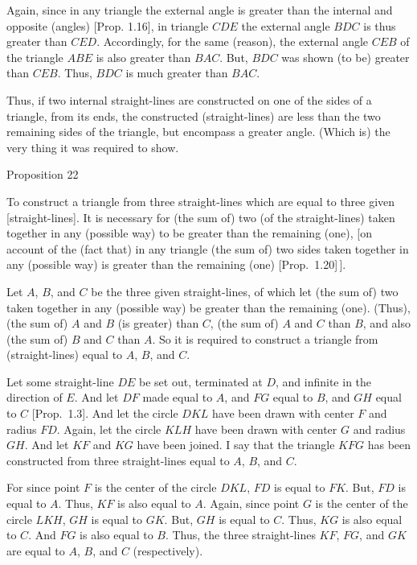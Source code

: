 Again, since in any  triangle the external angle 
is greater than the internal and opposite (angles) [Prop. 1.16],
 in triangle $CDE$ the external angle $BDC$ is thus greater
than $CED$.  Accordingly, for the same (reason),  the external angle $CEB$ of the
triangle $ABE$ is also greater than $BAC$. But, $BDC$ was shown (to be) 
greater
than $CEB$. Thus, $BDC$ is much greater than $BAC$.

Thus, if two internal straight-lines are constructed on one of the sides
of a triangle, from its ends, 
the constructed (straight-lines) are less than the two remaining 
sides of the triangle, but  encompass a greater angle. (Which is) the
very thing it was required to show.


\begin{center}
{\large Proposition 22}
\end{center}

To construct a triangle from three straight-lines which are equal to three given [straight-lines]. It is necessary for (the sum of) two (of the straight-lines) taken together in any (possible way) to be greater than the remaining (one), [on account of the (fact that)
 in any triangle (the sum of) two sides taken together in any (possible way) is greater than the remaining (one) [Prop.~1.20]\,].

\epsfysize=2.3in
\centerline{}

Let $A$, $B$, and $C$ be the three given straight-lines, of which let (the sum of) two taken together in any (possible way)
be greater than the remaining (one). (Thus), (the sum of) $A$ and $B$ (is greater) than $C$, (the sum of) $A$ and $C$ than $B$,
and also (the sum of) $B$ and $C$ than $A$. So it is required to construct a triangle
from (straight-lines) equal to $A$, $B$, and $C$.

Let some straight-line $DE$ be set out, terminated at $D$, and infinite in the
direction of $E$.  And let $DF$ made equal to $A$, and $FG$
equal to $B$, and $GH$ equal to $C$ [Prop.~1.3]. And let the
circle $DKL$ have been drawn with center $F$ and radius $FD$. Again,
let the circle $KLH$ have been drawn with center $G$ and radius $GH$. And
let $KF$ and $KG$ have been joined. I say that the triangle $KFG$ has been
constructed from three straight-lines equal to $A$, $B$, and $C$.

For since point $F$ is the center of the circle $DKL$, $FD$ is equal to $FK$.
But, $FD$ is equal to $A$. Thus, $KF$ is also equal to $A$. Again, since point
$G$ is the center of the circle $LKH$, $GH$ is equal to $GK$. But, $GH$ is equal
to $C$. Thus, $KG$ is also equal to $C$. And $FG$ is also equal to $B$. Thus,
the three straight-lines $KF$, $FG$, and $GK$ are equal to $A$, $B$, and $C$ (respectively).


